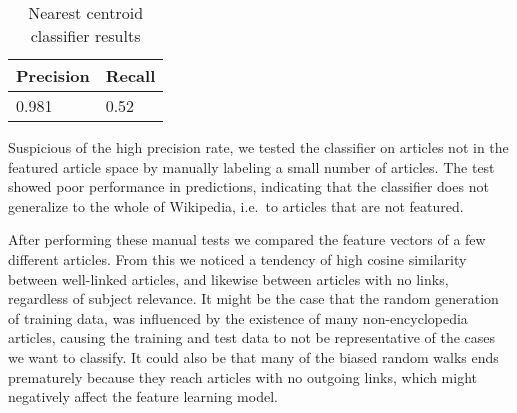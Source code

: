 \begin{table}[tbp]
\centering
\begin{tabular}{@{}ll@{}}
\toprule
Precision     & Recall       \\ \midrule
\num{0.981} & \num{0.52} \\
\bottomrule
\end{tabular}
\caption[Nearest centroid classifier results]{Nearest centroid classifier results}%
\label{eval-results}
\end{table}

Suspicious of the high precision rate, we tested the classifier on articles not in the featured article space by manually labeling a small number of articles. The test showed poor performance in predictions, indicating that the classifier does not generalize to the whole of Wikipedia, i.e.\ to articles that are not featured.

After performing these manual tests we compared the feature vectors of a few different articles. From this we noticed a tendency of high cosine similarity between well-linked articles, and likewise between articles with no links, regardless of subject relevance. It might be the case that the random generation of training data, was influenced by the existence of many non-encyclopedia articles, causing the training and test data to not be representative of the cases we want to classify. It could also be that many of the biased random walks ends prematurely because they reach articles with no outgoing links, which might negatively affect the feature learning model.



